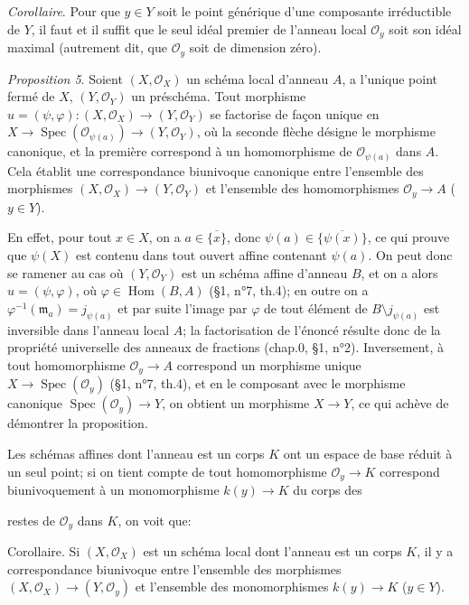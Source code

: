 \noindent \emph{Corollaire}. Pour que $y \in Y$ soit le point générique d'une composante irréductible de $Y$, il faut et il suffit que le seul idéal premier de l'anneau local $\mathcal{O}_y$ soit son idéal maximal (autrement dit, que $\mathcal{O}_y$ soit de dimension zéro).

\noindent \emph{Proposition 5}. Soient $(X, \mathcal{O}_X)$ un schéma local d'anneau $A$, a l'unique point fermé de $X$, $(Y, \mathcal{O}_Y)$ un préschéma. Tout morphisme $u = (\psi, \varphi) : (X, \mathcal{O}_X) \to (Y, \mathcal{O}_Y)$ se factorise de façon unique en $X \to \operatorname{Spec}(\mathcal{O}_{\psi(a)}) \to (Y, \mathcal{O}_Y)$, où la seconde flèche désigne le morphisme canonique, et la première correspond à un homomorphisme de $\mathcal{O}_{\psi(a)}$ dans $A$. Cela établit une correspondance biunivoque canonique entre l'ensemble des morphismes $(X, \mathcal{O}_X) \to (Y, \mathcal{O}_Y)$ et l'ensemble des homomorphismes $\mathcal{O}_y \to A$ ($y \in Y$).

\noindent En effet, pour tout $x \in X$, on a $a \in \overline{\{x\}}$, donc $\psi(a) \in \overline{\{\psi(x)\}}$, ce qui prouve que $\psi(X)$ est contenu dans tout ouvert affine contenant $\psi(a)$. On peut donc se ramener au cas où $(Y, \mathcal{O}_Y)$ est un schéma affine d'anneau $B$, et on a alors $u = (\psi, \varphi)$, où $\varphi \in \operatorname{Hom}(B, A)$ (§1, n°7, th.4); en outre on a $\varphi^{-1}(\mathfrak{m}_a) = j_{\psi(a)}$ et par suite l'image par $\varphi$ de tout élément de $B \setminus j_{\psi(a)}$ est inversible dans l'anneau local $A$; la factorisation de l'énoncé résulte donc de la propriété universelle des anneaux de fractions (chap.0, §1, n°2). Inversement, à tout homomorphisme $\mathcal{O}_y \to A$ correspond un morphisme unique $X \to \operatorname{Spec}(\mathcal{O}_y)$ (§1, n°7, th.4), et en le composant avec le morphisme canonique $\operatorname{Spec}(\mathcal{O}_y) \to Y$, on obtient un morphisme $X \to Y$, ce qui achève de démontrer la proposition.

\noindent Les schémas affines dont l'anneau est un corps $K$ ont un espace de base réduit à un seul point; si on tient compte de tout homomorphisme $\mathcal{O}_y \to K$ correspond biunivoquement à un monomorphisme $k(y) \to K$ du corps des

\newpage


restes de $\mathcal{O}_y$ dans $K$, on voit que:

Corollaire. Si $(X, \mathcal{O}_X)$ est un schéma local dont l'anneau est un corps $K$, il y a correspondance biunivoque entre l'ensemble des morphismes $(X, \mathcal{O}_X) \to (Y, \mathcal{O}_y)$ et l'ensemble des monomorphismes $k(y) \to K$ ($y \in Y$).

